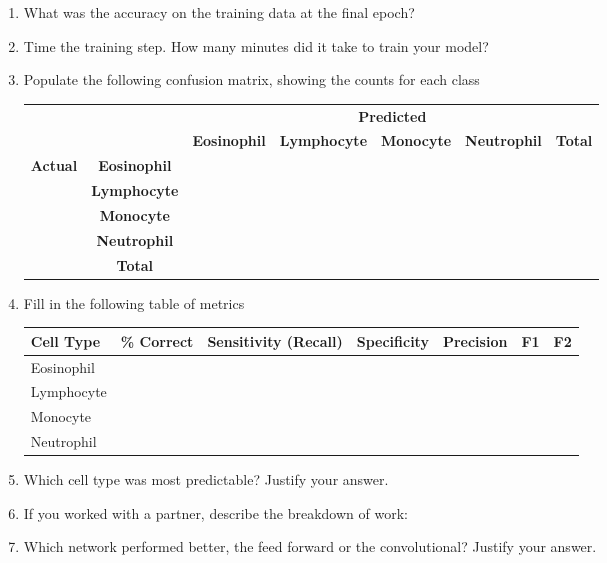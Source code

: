 \documentclass[11pt]{article}
\renewcommand\:{\colon} %
\begin{document}
\begin{enumerate}
\item What was the accuracy on the training data at the final epoch? 

\item Time the training step. How many minutes did it take to train your model?

\item Populate the following confusion matrix, showing the counts for each class

\begin{tabular}{|l|c|c|c|c|c|c|} \hline
\multicolumn{2}{|c|}{ } &  \multicolumn{5}{|c|}{\textbf{Predicted}}  \\ \cline{3-7}
\multicolumn{2}{|c|}{ } & \textbf{Eosinophil} & \textbf{Lymphocyte} & \textbf{Monocyte} & \textbf{Neutrophil} & \textbf{Total}   \\ \hline
\multirow{ 4}{*}{\textbf{Actual}}& \textbf{Eosinophil}  & & & & & \\ \cline{2-7}
& \textbf{Lymphocyte}    & & & & & \\ \cline{2-7}
& \textbf{Monocyte}    & & & & & \\ \cline{2-7}
& \textbf{Neutrophil}   & & & & &\\ \cline{2-7}
& \textbf{Total} & & & & & \\ \hline
\end{tabular}

\item Fill in the following table of metrics


\begin{tabular}{|l|c|c|c|c|c|c|} \hline
\textbf{Cell Type} & \textbf{\% Correct} & \textbf{Sensitivity (Recall)} & \textbf{Specificity} & \textbf{Precision} & \textbf{F1} & \textbf{F2} \\ \hline
Eosinophil & & & & & & \\ \hline
Lymphocyte &  & & & & & \\ \hline
Monocyte &  & & & & & \\ \hline
Neutrophil & & & & & & \\ \hline
\end{tabular}
\item Which cell type was most predictable? Justify your answer.


\item If you worked with a partner, describe the breakdown of work:


\item Which network performed better, the feed forward or the convolutional? Justify your answer.


\end{enumerate}
\end{document}
